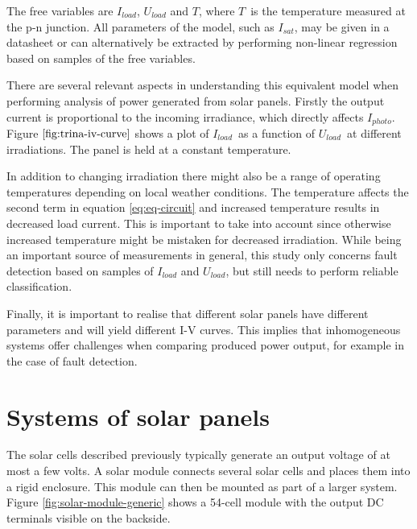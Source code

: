 The free variables are $I_{load}$, $U_{load}$ and $T$, where $T$ is the temperature measured at the p-n junction.
All parameters of the model, such as $I_{sat}$, may be given in a datasheet or can alternatively be extracted by performing non-linear regression based on samples of the free variables\cite{Walker2001}.

There are several relevant aspects in understanding this equivalent model when performing analysis of power generated from solar panels.
Firstly the output current is proportional to the incoming irradiance, which directly affects $I_{photo}$.
Figure $\ref{fig:trina-iv-curve}$ shows a plot of $I_{load}$ as a function of $U_{load}$ at different irradiations.
The panel is held at a constant temperature.


In addition to changing irradiation there might also be a range of operating temperatures depending on local weather conditions.
The temperature affects the second term in equation \ref{eq:eq-circuit} and increased temperature results in decreased load current.
This is important to take into account since otherwise increased temperature might be mistaken for decreased irradiation.
While being an important source of measurements in general, this study only concerns fault detection based on samples of $I_{load}$ and $U_{load}$, but still needs to perform reliable classification.

Finally, it is important to realise that different solar panels have different parameters and will yield different I-V curves.
This implies that inhomogeneous systems offer challenges when comparing produced power output, for example in the case of fault detection.

\section{Systems of solar panels}
The solar cells described previously typically generate an output voltage of at most a few volts\cite{Zhao2010thesis}.
A solar module connects several solar cells and places them into a rigid enclosure.
This module can then be mounted as part of a larger system.
Figure \ref{fig:solar-module-generic} shows a 54-cell module with the output DC terminals visible on the backside.


